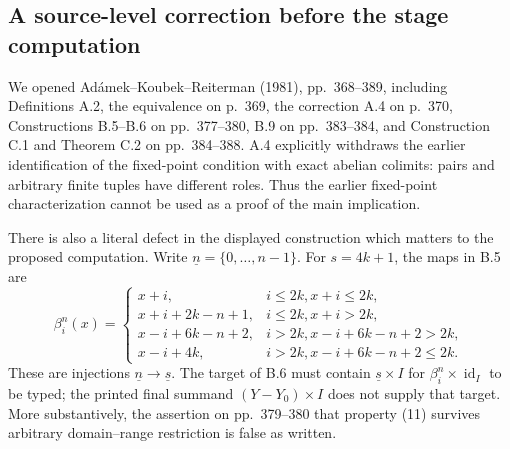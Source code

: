 \documentclass[11pt,a4paper]{article}
\theoremstyle{definition}
\begin{document}
\subsection{A source-level correction before the stage computation}
We opened Ad\'amek--Koubek--Reiterman (1981), pp.~368--389, including
Definitions A.2, the equivalence on p.~369, the correction A.4 on p.~370,
Constructions B.5--B.6 on pp.~377--380, B.9 on pp.~383--384, and
Construction C.1 and Theorem C.2 on pp.~384--388.  A.4 explicitly
withdraws the earlier identification of the fixed-point condition with
exact abelian colimits: pairs and arbitrary finite tuples have different
roles.  Thus the earlier fixed-point characterization cannot be used as
a proof of the main implication.

There is also a literal defect in the displayed construction which
matters to the proposed computation.  Write $\underline n=\{0,\ldots,n-1\}$.
For $s=4k+1$, the maps in B.5 are
\[
 \beta_i^{n}(x)=
 \begin{cases}
 x+i,&i\leq2k, x+i\leq2k,\\
 x+i+2k-n+1,&i\leq2k, x+i>2k,\\
 x-i+6k-n+2,&i>2k, x-i+6k-n+2>2k,\\
 x-i+4k,&i>2k, x-i+6k-n+2\leq2k.
 \end{cases}
\]
These are injections $\underline n\to\underline s$.
The target of B.6 must contain $\underline s\times I$ for
$\beta_i^n\times\operatorname{id}_I$ to be typed; the printed final
summand $(Y-Y_0)\times I$ does not supply that target.
More substantively, the assertion on pp.~379--380 that property (11)
survives arbitrary domain--range restriction is false as written.
\end{document}

